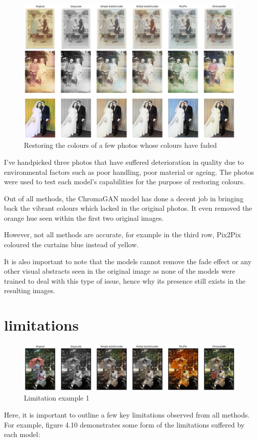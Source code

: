 \begin{figure}[H]
    \centering
    \includegraphics[width=1\columnwidth]{sections/figures/colour_resortation.png}
    \caption{Restoring the colours of a few photos whose colours have faded}
    \label{fig:my_label}
\end{figure}


 I've handpicked three photos that have suffered deterioration in quality due to environmental factors such as poor handling, poor material or ageing. The photos were used to test each model's capabilities for the purpose of restoring colours. 

 Out of all methods, the ChromaGAN model has done a decent job in bringing back the vibrant colours which lacked in the original photos. It even removed the orange hue seen within the first two original images.

 However, not all methods are accurate, for example in the third row, Pix2Pix coloured the curtains blue instead of yellow. 

 It is also important to note that the models cannot remove the fade effect or any other visual abstracts seen in the original image as none of the models were trained to deal with this type of issue, hence why its presence still exists in the resulting images. 
\pagebreak
\section{limitations}
\begin{figure}[H]
    \centering
    \includegraphics[width=1\columnwidth]{sections/figures/limitation1.png}
    \caption{Limitation example 1}
    \label{fig:my_label}
\end{figure}
Here, it is important to outline a few key limitations observed from all methods. For example, figure 4.10 demonstrates some form of the limitations suffered by each model:


